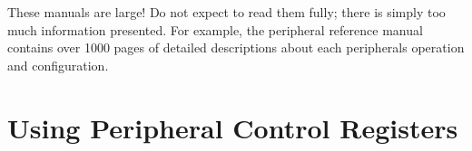 \documentclass[11pt,fleqn]{book} %
\begin{document}
\begin{warning}
    These manuals are large! Do not expect to read them fully; there is simply too much information presented. For example, the peripheral reference manual contains over 1000 pages of detailed descriptions about each peripherals operation and configuration.
\end{warning}


\section{Using Peripheral Control Registers}



%
%
%
%
%    
%
%
\end{document}
